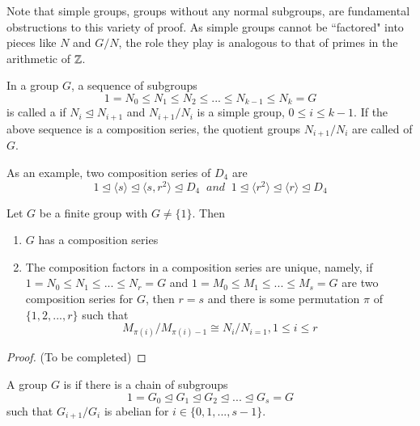 \documentclass[12pt, a4paper, oneside, openright, titlepage]{book}
\begin{document}
Note that simple groups, groups without any normal subgroups, are fundamental obstructions to this variety of proof. As simple groups cannot be ``factored" into pieces like $N$ and $G/N$, the role they play is analogous to that of primes in the arithmetic of $\mathbb Z$. 

\begin{defn}
    In a group $G$, a sequence of subgroups \begin{equation*}
        1 = N_0 \leq N_1 \leq N_2 \leq ... \leq N_{k-1} \leq N_k = G
    \end{equation*}
    is called a  if $N_i \trianglelefteq N_{i+1}$ and $N_{i+1}/N_i$ is a simple group, $0 \leq i \leq k-1$. If the above sequence is a composition series, the quotient groups $N_{i+1}/N_i$ are called  of $G$.
\end{defn}

As an example, two composition series of $D_4$ are \begin{equation*}
    1\trianglelefteq \langle s \rangle \trianglelefteq \langle s,r^2\rangle \trianglelefteq D_4\;\;and\;\;1 \trianglelefteq \langle r^2\rangle \trianglelefteq \langle r \rangle \trianglelefteq D_4
\end{equation*}


\begin{namthm}\label{thmname:JHseries}
    Let $G$ be a finite group with $G \neq \{1\}$. Then \begin{enumerate}
        \item $G$ has a composition series
        \item The composition factors in a composition series are unique, namely, if $1 = N_0 \leq N_1 \leq ... \leq N_r = G$ and $1 = M_0 \leq M_1 \leq ... \leq M_s = G$ are two composition series for $G$, then $r = s$ and there is some permutation $\pi$ of $\{1,2,...,r\}$ such that \begin{equation*}
                M_{\pi(i)}/M_{\pi(i)-1}\cong N_i/N_{i=1}, 1 \leq i \leq r
        \end{equation*}
    \end{enumerate}
\end{namthm}
\begin{proof}
    (To be completed)
\end{proof}


\begin{defn}
    A group $G$ is  if there is a chain of subgroups \begin{equation*}
        1 = G_0 \trianglelefteq G_1 \trianglelefteq G_2 \trianglelefteq ... \trianglelefteq G_s = G
    \end{equation*}
    such that $G_{i+1}/G_i$ is abelian for $i \in \{0,1,...,s-1\}$.
\end{defn}
\end{document}

